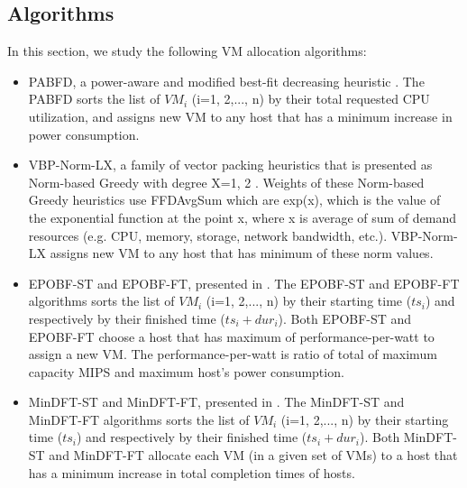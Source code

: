 \subsection{Algorithms}

In this section, we study the following VM allocation algorithms:

\begin{itemize}
\item
PABFD, a power-aware and modified best-fit decreasing heuristic \cite{Beloglazov2011}\cite{Beloglazov2012}.
The PABFD sorts the  list of $VM_{i}$ (i=1, 2,..., n) by
their total requested CPU utilization, and 
assigns new VM to any host that has a minimum increase in power consumption.

\item
VBP-Norm-LX, a family of vector packing heuristics that
is presented as Norm-based Greedy with degree X={1, 2} \cite{Panigrahy2011}.
Weights of these Norm-based Greedy heuristics use FFDAvgSum which are exp(x), which is the value of the exponential function at the point x, where x is 
average of sum of demand resources (e.g. CPU, memory, storage, network bandwidth, etc.).
VBP-Norm-LX assigns new VM to any host that has minimum of these norm values.


\item
EPOBF-ST and EPOBF-FT, presented in \cite{Quang-Hung2014}. The EPOBF-ST and EPOBF-FT algorithms sorts the list of $VM_{i}$ (i=1, 2,..., n) by their starting time ($ts_{i}$) and respectively by their finished time ($ts_{i}+dur_{i}$). Both EPOBF-ST and EPOBF-FT choose a host that has maximum of performance-per-watt to assign a new VM. The performance-per-watt is ratio of total of maximum capacity MIPS and maximum host's power consumption.

\item
MinDFT-ST and MinDFT-FT, presented in \cite{HungFDSE2014}. The MinDFT-ST and MinDFT-FT algorithms sorts the list of $VM_{i}$ (i=1, 2,..., n) by their starting time ($ts_{i}$) and respectively by their finished time ($ts_{i}+dur_{i}$). Both MinDFT-ST and MinDFT-FT allocate each VM (in a given set of VMs) to a host that has a minimum increase in total completion times of hosts.


\end{itemize}
